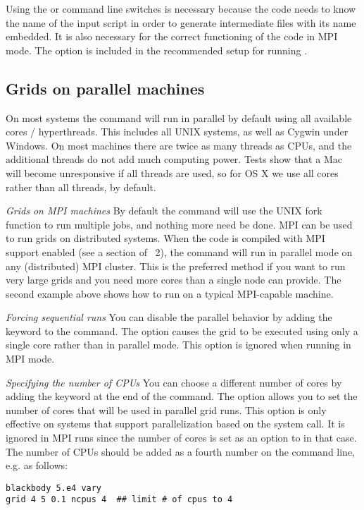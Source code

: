 Using the  or  command line switches is
necessary because the code needs to know the name of the input script in order
to generate intermediate files with its name embedded. It is also necessary
for the correct functioning of the code in MPI mode.
The  option is included in the recommended setup for
running \Cloudy.

\subsection{Grids on parallel machines}

On most systems the  command will run in parallel by default using all
available cores / hyperthreads. This includes all UNIX systems, as
well as Cygwin under Windows.
On most machines there are twice as many threads as CPUs, and the
additional threads do not add much computing power.
Tests show that a Mac will become unresponsive if all threads are used, so for OS X
we use all cores rather than all threads, by default.

\emph{Grids on MPI machines}
By default the  command will use the UNIX fork function to 
run multiple jobs, and nothing more need be done.
MPI can be used to run grids on distributed systems.
When the code is
compiled with MPI support enabled (see a section of \Hazy~2),
the  command will run
in parallel mode on any (distributed) MPI cluster. This is the preferred method if you
want to run very large grids and you need more cores than a single node can provide.
The second example above shows how to run on a typical MPI-capable machine.

\emph{Forcing sequential runs}
You can disable the parallel behavior by adding
the keyword  to the  command. 
The  option causes the grid to be executed using only a
single core rather than in parallel mode. This option is ignored when running
in MPI mode.

\emph{Specifying the number of CPUs}
You can
choose a different number of cores by adding the keyword 
at the end of the  command. 
The  option allows you to set the number of cores that will
be used in parallel grid runs. This option is only effective on systems that
support parallelization based on the  system call. It is
ignored in MPI runs since the number of cores is set as an option to
 in that case. 
The number of CPUs should be added as a fourth number on
the command line, e.g. as follows:
\begin{verbatim}
blackbody 5.e4 vary
grid 4 5 0.1 ncpus 4  ## limit # of cpus to 4
\end{verbatim}

